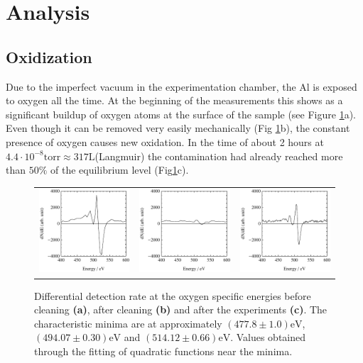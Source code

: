 \documentclass[a4paper]{scrartcl}
\numberwithin{equation}{section}
\numberwithin{figure}{section}
\numberwithin{table}{section}
\begin{document}
\clearpage

\section{Analysis}
\subsection{Oxidization}
Due to the imperfect vacuum in the experimentation chamber, the Al is exposed to oxygen all the time. At the beginning of the measurements this shows as a significant buildup of oxygen atoms at the surface of the sample (see Figure \ref{fig:putz}a). Even though it can be removed very easily mechanically (Fig \ref{fig:putz}b), the constant presence of oxygen causes new oxidation. In the time of about 2 hours at $4.4 \cdot 10^{-8} \text{torr} \approx 317 \text{L}$(Langmuir) the contamination had already reached more than $50\%$ of the equilibrium level (Fig\ref{fig:putz}c).
\begin{figure}[!h]
        \begin{center}
        \begin{tabular}{l c r}
        		\includegraphics[width=0.31\linewidth]{pic/putz1.pdf}
       	&
       		\includegraphics[width=0.31\linewidth]{pic/putz2.pdf}
			&
				\includegraphics[width=0.31\linewidth]{pic/putzAfter.pdf}
		  \end{tabular}
        \end{center}
        \caption[differential detection rate at the O specific energies]{
			\small Differential detection rate at the oxygen specific energies before cleaning \textbf{(a)}, after cleaning \textbf{(b)} and after the experiments \textbf{(c)}. The characteristic minima are at approximately $(477.8\pm1.0)\text{eV}$, $(494.07\pm0.30)\text{eV}$ and $(514.12\pm0.66)\text{eV}$. Values obtained through the fitting of quadratic functions near the minima.
        }
        \label{fig:putz}
\end{figure}
\FloatBarrier
\end{document}
